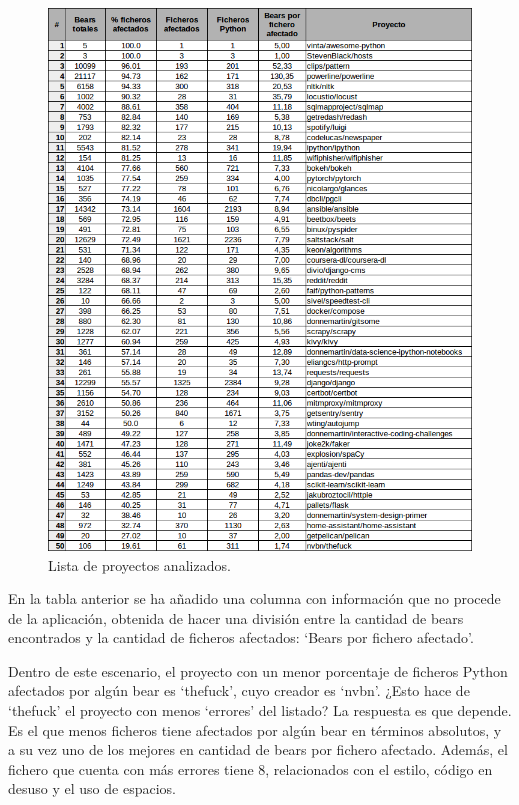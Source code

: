 \documentclass[a4paper, 12pt]{book}
\begin{document}
\begin{figure}[H]
  \centering
  \includegraphics[width=15cm, keepaspectratio]{img/anexoTabla}
  \caption{Lista de proyectos analizados.}
  \label{fig:anexoTabla}
\end{figure}

En la tabla anterior se ha añadido una columna con información que no procede de la aplicación, obtenida de hacer una división entre la cantidad de bears encontrados y la cantidad de ficheros afectados: `Bears por fichero afectado'.

Dentro de este escenario, el proyecto con un menor porcentaje de ficheros Python afectados por algún bear es `thefuck', cuyo creador es `nvbn'. ¿Esto hace de `thefuck' el proyecto con menos `errores' del listado? La respuesta es que depende. Es el que menos ficheros tiene afectados por algún bear en términos absolutos, y a su vez uno de los mejores en cantidad de bears por fichero afectado. Además, el fichero que cuenta con más errores tiene 8, relacionados con el estilo, código en desuso y el uso de espacios.
\end{document}
